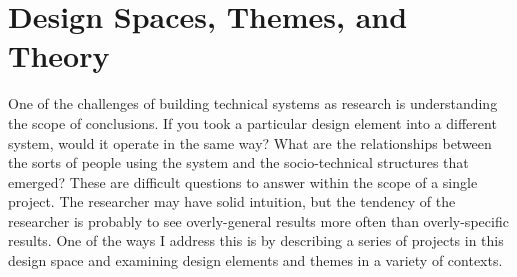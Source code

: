 % 
% 
% 
% 
% 
% 
% 
% 
% 



\section{Design Spaces, Themes, and Theory}

One of the challenges of building technical systems as research is understanding the scope of conclusions. If you took a particular design element into a different system, would it operate in the same way? What are the relationships between the sorts of people using the system and the socio-technical structures that emerged? These are difficult questions to answer within the scope of a single project. The researcher may have solid intuition, but the tendency of the researcher is probably to see overly-general results more often than overly-specific results. One of the ways I address this is by describing a series of projects in this design space and examining design elements and themes in a variety of contexts.


